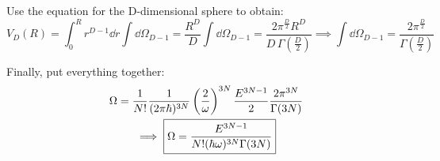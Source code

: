 \documentclass[11pt,a4paper]{scrartcl}
\begin{document}
Use the equation for the D-dimensional sphere to obtain:
\begin{equation*}
    V_D(R) = \int_0^R r^{D-1}\dd{r} \int\dd{\Omega_{D-1}} = \frac{R^D}{D} \int\dd{\Omega_{D-1}}
    = \frac{2\pi^{\frac{D}{2}}R^D}{D\,\Gamma\left(\frac{D}{2}\right)}
    \implies \int\dd{\Omega_{D-1}} = \frac{2\pi^{\frac{D}{2}}}{\Gamma\left(\frac{D}{2}\right)}
\end{equation*}

Finally, put everything together:
\begin{gather*}
    \Omega=\frac{1}{N!}\frac{1}{(2\pi\hbar)^{3N}}\left(\frac{2}{\omega}\right)^{3N}
    \frac{E^{3N-1}}{2}\frac{2\pi^{3N}}{\Gamma(3N)} \\
    \implies\boxed{%
        \Omega=\frac{E^{3N-1}}{N!(\hbar\omega)^{3N}\Gamma(3N)}
    }
\end{gather*}
\end{document}
